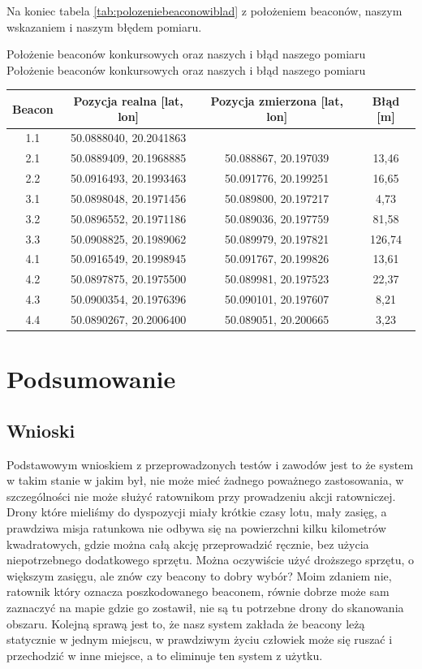 Na koniec tabela \ref{tab:polozeniebeaconowiblad} z położeniem beaconów, naszym wskazaniem i naszym błędem pomiaru.

\begin{tablica}
    {Położenie beaconów konkursowych oraz naszych i błąd naszego pomiaru}
    {Położenie beaconów konkursowych oraz naszych i błąd naszego pomiaru}
    {
    \begin{tabular}{|c|c|c|c|} \hline
	    \textbf{Beacon} & \textbf{Pozycja realna [lat, lon]} & \textbf{Pozycja zmierzona [lat, lon]} & \textbf{Błąd [m]} \\ \hline
	    1.1 & 50.0888040, 20.2041863 & & \\ \hline
	    2.1 & 50.0889409, 20.1968885 & 50.088867, 20.197039 & 13,46 \\ \hline
	    2.2 & 50.0916493, 20.1993463 & 50.091776, 20.199251 & 16,65 \\ \hline
	    3.1 & 50.0898048, 20.1971456 & 50.089800, 20.197217 & 4,73 \\ \hline
	    3.2 & 50.0896552, 20.1971186 & 50.089036, 20.197759 & 81,58 \\ \hline
	    3.3 & 50.0908825, 20.1989062 & 50.089979, 20.197821 & 126,74 \\ \hline
	    4.1 & 50.0916549, 20.1998945 & 50.091767, 20.199826 & 13,61 \\ \hline
	    4.2 & 50.0897875, 20.1975500 & 50.089981, 20.197523 & 22,37 \\ \hline
	    4.3 & 50.0900354, 20.1976396 & 50.090101, 20.197607 & 8,21 \\ \hline
	    4.4 & 50.0890267, 20.2006400 & 50.089051, 20.200665 & 3,23 \\ \hline
   \end{tabular}
    }
    \label{tab:polozeniebeaconowiblad}
\end{tablica}

\section{Podsumowanie}

\subsection{Wnioski}

Podstawowym wnioskiem z przeprowadzonych testów i zawodów jest to że system w takim stanie w jakim był, nie może mieć żadnego poważnego zastosowania, w szczególności nie może służyć ratownikom przy prowadzeniu akcji ratowniczej. Drony które mieliśmy do dyspozycji miały krótkie czasy lotu, mały zasięg, a prawdziwa misja ratunkowa nie odbywa się na powierzchni kilku kilometrów kwadratowych, gdzie można całą akcję przeprowadzić ręcznie, bez użycia niepotrzebnego dodatkowego sprzętu. Można oczywiście użyć droższego sprzętu, o większym zasięgu, ale znów czy beacony to dobry wybór? Moim zdaniem nie, ratownik który oznacza poszkodowanego beaconem, równie dobrze może sam zaznaczyć na mapie gdzie go zostawił, nie są tu potrzebne drony do skanowania obszaru. Kolejną sprawą jest to, że nasz system zakłada że beacony leżą statycznie w jednym miejscu, w prawdziwym życiu człowiek może się ruszać i przechodzić w inne miejsce, a to eliminuje ten system z użytku.

